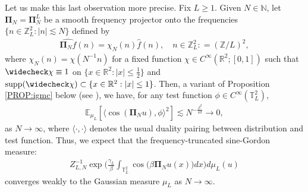 \documentclass[letterpaper, 11pt,  reqno]{amsart}
\theoremstyle{myremark}
\DeclareMathOperator*{\supp}{supp}
\newcommand{\1}{\hspace{0.5mm}\text{I}\hspace{0.5mm}}
\newcommand{\Z}{\mathbb{Z}}
\newcommand{\R}{\mathbb{R}}
\newcommand{\T}{\mathbb{T}}
\newcommand{\Pii}{\mathbf{\Pi}}
\newcommand{\E}{\mathbb{E}}
\newcommand{\be}{\beta}
\newcommand{\g}{\gamma}
\newcommand{\ft}{\widehat}
\newcommand{\les}{\lesssim}
\newcommand{\jb}[1]
{\langle #1 \rangle}
\newcommand{\too}{\longrightarrow}
\newcommand{\N}{\mathbb{N}}
\numberwithin{equation}{section}
\numberwithin{theorem}{section}
\begin{document}
Let us make this last observation  more precise. 
Fix $L \ge 1$. Given  $N \in \N$,  let  $\Pii_N = \Pii_{N}^L$  be a smooth frequency projector
onto the frequencies  $\{n\in\Z_L^2:|n|\les N\}$
defined by 
\begin{align}
\ft{ \Pii_{N} f}(n) =   \chi_N(n) \ft f (n), \quad n \in \Z_L^2
: = (\Z/L)^2, 
\label{chi}
\end{align}
where 
$\chi_N(n) = \chi(N^{-1}  n)$ for a fixed 
function
 $\chi \in C^\infty(\R^2; [0, 1])$ 
such that 
$\widecheck \chi\equiv 1$ 
on $\{x\in\R^2:|x|\leq \tfrac12\}$
and $\supp (\widecheck \chi) \subset \{x\in\R^2:|x|\leq 1\}$.
 Then, a variant of Proposition \ref{PROP:igmc} below
 (see \cite[Theorem 3.5]{HS}), 
 we have, for any test function $\phi \in C^\infty (\T^2_L)$, 
\begin{align*}
\E_{\mu_L} [  \jb{ \cos(\Pii_N u), \phi}^2 ] \les N^{-\frac{\be^2}{4\pi}} \too 0,
\end{align*}
as $N \to \infty$, 
where  $\jb{ \cdot, \cdot}$ denotes the usual duality pairing between distribution and test function. 
Thus,   we expect that the frequency-truncated sine-Gordon measure:
\begin{align*}
Z_{L,N}^{-1}  \exp 
\bigg( \frac{\g_L}{\be} \int_{\T^2_L}\cos\big(\be \Pii_N u(x)\big)dx \bigg) d\mu_L(u)
\end{align*}
converges weakly to the Gaussian measure $\mu_L$ as $N \to \infty$. 
\end{document}
